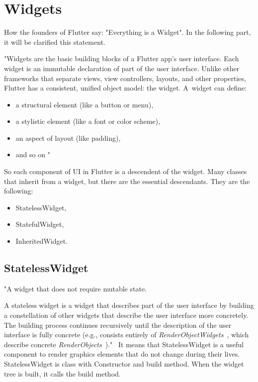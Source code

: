 \section{Widgets}\label{sec:widgets}
How the founders of Flutter say: "Everything is a Widget".
In the following part, it will be clarified this statement.

"Widgets are the basic building blocks of a Flutter app's user interface.
Each widget is an immutable declaration of part of the user interface.
Unlike other frameworks that separate views, view controllers, layouts, and other properties, Flutter has a consistent, unified object model: the widget.
A~widget can define:
\begin{itemize}
    \item a structural element (like a button or menu),
    \item a stylistic element (like a font or color scheme),
    \item an aspect of layout (like padding),
    \item and so on \textellipsis"~\cite{flutterTechnicalOverview}
\end{itemize}

So each component of UI in Flutter is a descendent of the widget.
Many classes that inherit from a widget, but there are the essential descendants.
They are the following:
\begin{itemize}
    \item StatelessWidget,
    \item StatefulWidget,
    \item InheritedWidget.
\end{itemize}


\subsection{StatelessWidget}\label{subsec:statelesswidget}
"A widget that does not require mutable state.

A stateless widget is a widget that describes part of the user interface by building a constellation of other widgets that describe the user interface more concretely.
The building process continues recursively until the description of the user interface is fully concrete (e.g., consists entirely of
\textit{RenderObjectWidgets}~\cite{renderObjectWidget}, which describe concrete \textit{RenderObjects}~\cite{renderObject})."~\cite{statelessWidget}
It means that StatelessWidget is a useful component to render graphics elements that do not change during their lives.
StatelessWidget is class with Constructor and build method.
When the widget tree is built, it calls the build method.

